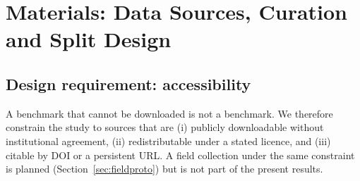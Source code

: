 \documentclass[10pt,twocolumn,a4paper]{article}
\begin{document}
\section{Materials: Data Sources, Curation and Split Design}
\label{sec:materials}

\subsection{Design requirement: accessibility}
A benchmark that cannot be downloaded is not a benchmark. We therefore constrain the study to sources that are (i) publicly downloadable without institutional agreement, (ii) redistributable under a stated licence, and (iii) citable by DOI or a persistent URL. A field collection under the same constraint is planned (Section~\ref{sec:fieldproto}) but is not part of the present results.
\end{document}
